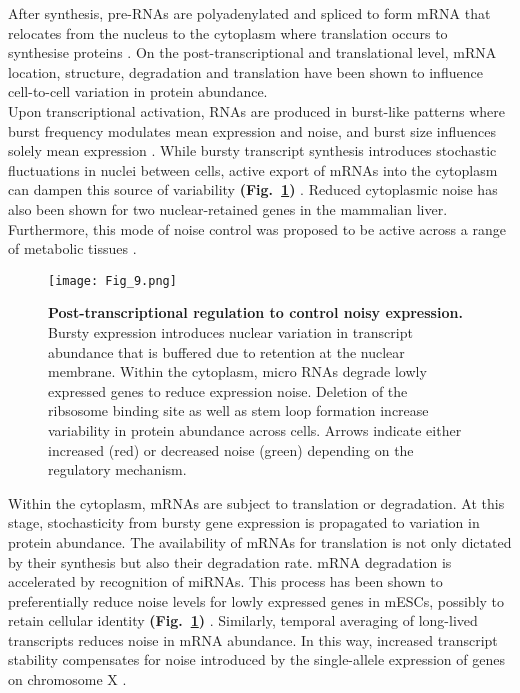 After synthesis, pre-RNAs are polyadenylated and spliced to form mRNA that relocates from the nucleus to the cytoplasm where translation occurs to synthesise proteins \cite{Glisovic2008}. On the post-transcriptional and translational level, mRNA location, structure, degradation and translation have been shown to influence cell-to-cell variation in protein abundance.\\

Upon transcriptional activation, RNAs are produced in burst-like patterns where burst frequency modulates mean expression and noise, and burst size influences solely mean expression \citep{Hornung2012}. While bursty transcript synthesis introduces stochastic fluctuations in nuclei between cells, active export of mRNAs into the cytoplasm can dampen this source of variability \textbf{(Fig.~\ref{fig0:posttranscriptional})} \citep{Battich2015a}. Reduced cytoplasmic noise has also been shown for two nuclear-retained genes in the mammalian liver. Furthermore, this mode of noise control was proposed to be active across a range of metabolic tissues \cite{BaharHalpern2015a}.\\

\begin{figure}[!h]
\centering
\texttt{[image: Fig\_9.png]}
\caption[Post-transcriptional regulation to control noisy expression]{\textbf{Post-transcriptional regulation to control noisy expression.}\\
Bursty expression introduces nuclear variation in transcript abundance that is buffered due to retention at the nuclear membrane. Within the cytoplasm, micro RNAs degrade lowly expressed genes to reduce expression noise. Deletion of the ribsosome binding site as well as stem loop formation increase variability in protein abundance across cells. Arrows indicate either increased (red) or decreased noise (green) depending on the regulatory mechanism.}
\label{fig0:posttranscriptional}
\end{figure} 

\newpage

Within the cytoplasm, mRNAs are subject to translation or degradation. At this stage, stochasticity from bursty gene expression is propagated to variation in protein abundance. The availability of mRNAs for translation is not only dictated by their synthesis but also their degradation rate. mRNA degradation is accelerated by recognition of \glspl{miRNA}. This process has been shown to preferentially reduce noise levels for lowly expressed genes in mESCs, possibly to retain cellular identity \textbf{(Fig.~\ref{fig0:posttranscriptional})} \citep{Schmiedel2015}. Similarly, temporal averaging of long-lived transcripts reduces noise in mRNA abundance. In this way, increased transcript stability compensates for noise introduced by the single-allele expression of genes on chromosome X \citep{Faure2017}.  \\

